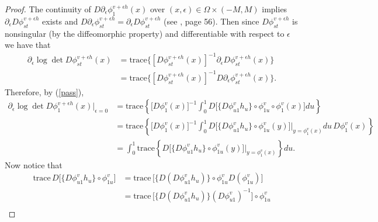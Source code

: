 \documentclass[noinfoline]{imsart}
\begin{document}
\begin{proof}
The continuity of $D {\partial_\epsilon}  \phi^{ v+\epsilon h}_{1}(x)$ over $(x,\epsilon)\in \Omega\times (-M,M)$ implies  $ \partial_\epsilon D \phi^{ v+\epsilon h}_{st}$ exists and   $D {\partial_\epsilon}  \phi^{ v+\epsilon h}_{st}  =  {\partial_\epsilon} D \phi^{ v+\epsilon h}_{st}$ (see \cite{cou:36}, page 56). Then since $D\phi_{st}^{v+\epsilon h}$ is nonsingular (by the diffeomorphic property) and differentiable  with respect to $\epsilon$ we have that
\begin{align*}
\partial_\epsilon  \log \det D\phi_{st}^{v+\epsilon h }(x)&= \text{trace}\bigl\{ [D\phi_{st}^{v+\epsilon h}(x)]^{-1}   \partial_\epsilon D\phi_{st}^{v+\epsilon h}(x) \bigr\} \\
 &= \text{trace}\bigl\{ [D\phi_{st}^{v+\epsilon h}(x)]^{-1}  D \partial_\epsilon \phi_{st}^{v+\epsilon h}(x)  \bigr\} .
\end{align*}
Therefore, by (\ref{pass}),
\begin{align*}
\partial_\epsilon  \log \det D\phi_{1}^{v+\epsilon h }(x)\bigr|_{\epsilon = 0} %
& =\text{trace}\left\{  \bigl[ D\phi_1^v(x) \bigr]^{-1} \int_0^1 D\bigl[ \{D\phi_{u1}^v h_u  \}\circ \phi_{1u}^v\circ \phi^v_1(x)  \bigr]  du  \right\} \\
& =\text{trace}\left\{  \bigl[ D\phi_1^v(x) \bigr]^{-1} \int_0^1 D\bigl[ \{D\phi_{u1}^v h_u  \}\circ \phi_{1u}^v(y)\bigr]\Bigr|_{y=\phi^v_1(x)}     du\, D\phi^v_1(x)  \right\} \\
& = \int_0^1\text{trace}\left\{  D\bigl[ \{D\phi_{u1}^v h_u  \}\circ \phi_{1u}^v(y)\bigr]\Bigr|_{y=\phi^v_1(x)}   \right\}    du .  
\end{align*}
Now notice that
\begin{align*}
\text{trace}\, D \bigl[ \{  D\phi_{u1}^v h_u\}\circ \phi^v_{1u}\bigr] 
&= \text{trace}\, \bigl[ \{  D (D\phi_{u1}^v h_u)\}\circ \phi^v_{1u} D(\phi^v_{1u})\bigr] \\
&= \text{trace}\, \bigl[    \{D  (D\phi_{u1}^v  h_u) \} (D\phi_{u1}^v )^{-1}\bigr]\circ \phi^v_{1u} \\

\end{align*}
\end{proof}
\end{document}
